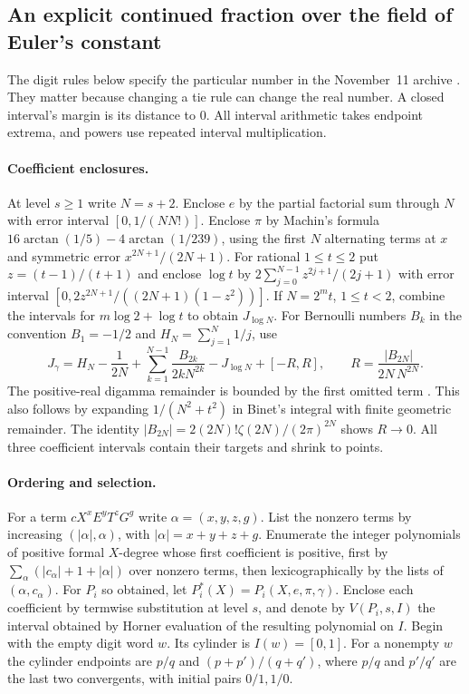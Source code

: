 \documentclass[11pt,a4paper]{article}
\theoremstyle{definition}
\theoremstyle{remark}
\begin{document}
\subsection{An explicit continued fraction over the field of Euler's constant}
The digit rules below specify the particular number in the November~11
archive \cite{nKeio}. They matter because changing a tie rule can change
the real number. A closed interval's margin is its distance to $0$.
All interval arithmetic takes endpoint extrema, and powers use repeated
interval multiplication.

\paragraph{Coefficient enclosures.}
At level $s\ge1$ write $N=s+2$. Enclose $e$ by the partial factorial
sum through $N$ with error interval $[0,1/(NN!)]$.
Enclose $\pi$ by Machin's formula $16\arctan(1/5)-4\arctan(1/239)$,
using the first $N$ alternating terms at $x$ and symmetric error
$x^{2N+1}/(2N+1)$. For rational $1\le t\le2$ put $z=(t-1)/(t+1)$
and enclose $\log t$ by $2\sum_{j=0}^{N-1}z^{2j+1}/(2j+1)$
with error interval $[0,2z^{2N+1}/((2N+1)(1-z^2))]$.
If $N=2^m t$, $1\le t<2$, combine the intervals for
$m\log2+\log t$ to obtain $J_{\log N}$. For Bernoulli numbers
$B_k$ in the convention $B_1=-1/2$ and $H_N=\sum_{j=1}^N1/j$, use
\[
 J_\gamma=H_N-\frac1{2N}+\sum_{k=1}^{N-1}\frac{B_{2k}}{2kN^{2k}}
             -J_{\log N}+[-R,R],
 \qquad R=\frac{|B_{2N}|}{2N\,N^{2N}} .
\]
The positive-real digamma remainder is bounded by the first omitted
term \cite[\S5.11]{aDLMF}. This also follows by expanding
$1/(N^2+t^2)$ in Binet's integral with finite geometric remainder.
The identity $|B_{2N}|=2(2N)!\zeta(2N)/(2\pi)^{2N}$ shows $R\to0$.
All three coefficient intervals contain their targets and shrink to points.

\paragraph{Ordering and selection.}
For a term $cX^xE^yT^zG^g$ write $\alpha=(x,y,z,g)$.
List the nonzero terms by increasing $(|\alpha|,\alpha)$, with
$|\alpha|=x+y+z+g$. Enumerate the integer polynomials of positive
formal $X$-degree whose first coefficient is positive, first by
$\sum_{\alpha}(|c_\alpha|+1+|\alpha|)$ over nonzero terms, then
lexicographically by the lists of $(\alpha,c_\alpha)$. For $P_i$ so
obtained, let $P_i^*(X)=P_i(X,e,\pi,\gamma)$. Enclose each coefficient
by termwise substitution at level $s$, and denote by $V(P_i,s,I)$ the
interval obtained by Horner evaluation of the resulting polynomial
on $I$. Begin with the empty digit word $w$. Its cylinder is
$I(w)=[0,1]$. For a nonempty $w$ the cylinder endpoints are
$p/q$ and $(p+p')/(q+q')$, where $p/q$ and $p'/q'$ are the last two
convergents, with initial pairs $0/1,1/0$.
\end{document}
